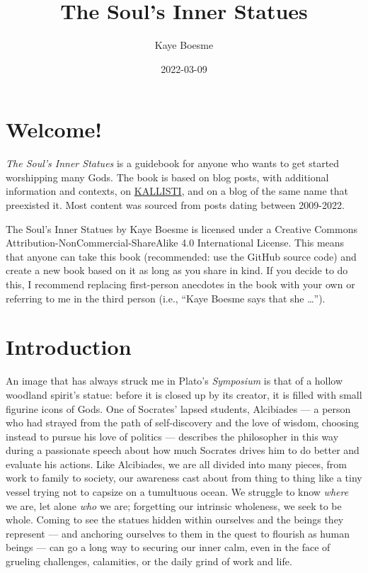 \documentclass[
]{book}
\title{The Soul's Inner Statues}
\author{Kaye Boesme}
\date{2022-03-09}
\begin{document}
\maketitle

{
\setcounter{tocdepth}{1}
\tableofcontents
}
\hypertarget{welcome}{%
\chapter{Welcome!}\label{welcome}}

\emph{The Soul's Inner Statues} is a guidebook for anyone who wants to get started worshipping many Gods. The book is based on blog posts, with additional information and contexts, on \href{https://kallisti.blog}{KALLISTI}, and on a blog of the same name that preexisted it. Most content was sourced from posts dating between 2009-2022.

{The Soul's Inner Statues} by Kaye Boesme is licensed under a Creative Commons Attribution-NonCommercial-ShareAlike 4.0 International License. This means that anyone can take this book (recommended: use the GitHub source code) and create a new book based on it as long as you share in kind. If you decide to do this, I recommend replacing first-person anecdotes in the book with your own or referring to me in the third person (i.e., ``Kaye Boesme says that she \ldots{}'').

\hypertarget{intro}{%
\chapter{Introduction}\label{intro}}

An image that has always struck me in Plato's \emph{Symposium} is that of a hollow woodland spirit's statue: before it is closed up by its creator, it is filled with small figurine icons of Gods. One of Socrates' lapsed students, Alcibiades --- a person who had strayed from the path of self-discovery and the love of wisdom, choosing instead to pursue his love of politics --- describes the philosopher in this way during a passionate speech about how much Socrates drives him to do better and evaluate his actions. Like Alcibiades, we are all divided into many pieces, from work to family to society, our awareness cast about from thing to thing like a tiny vessel trying not to capsize on a tumultuous ocean. We struggle to know \emph{where} we are, let alone \emph{who} we are; forgetting our intrinsic wholeness, we seek to be whole. Coming to see the statues hidden within ourselves and the beings they represent --- and anchoring ourselves to them in the quest to flourish as human beings --- can go a long way to securing our inner calm, even in the face of grueling challenges, calamities, or the daily grind of work and life.
\end{document}
